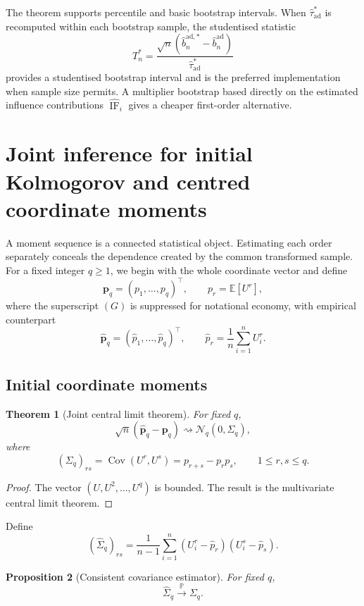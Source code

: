 \documentclass[11pt,a4paper]{article}
\newtheorem{theorem}{Theorem}[section]
\newtheorem{proposition}[theorem]{Proposition}
\theoremstyle{definition}
\newcommand{\E}{\mathbb{E}}
\newcommand{\Prob}{\mathbb{P}}
\newcommand{\Cov}{\operatorname{Cov}}
\newcommand{\IF}{\operatorname{IF}}
\begin{document}
The theorem supports percentile and basic bootstrap intervals. When $\widehat\tau_{\mathrm{ad}}^*$ is recomputed within each bootstrap sample, the studentised statistic
\[
T_n^*
=
\frac{\sqrt n(
\widehat b_n^{\mathrm{ad},*}-\widehat b_n^{\mathrm{ad}})}
{\widehat\tau_{\mathrm{ad}}^*}
\]
provides a studentised bootstrap interval and is the preferred implementation when sample size permits. A multiplier bootstrap based directly on the estimated influence contributions $\widehat{\IF}_i$ gives a cheaper first-order alternative.

\section{Joint inference for initial Kolmogorov and centred coordinate moments}\label{sec:moments}

A moment sequence is a connected statistical object. Estimating each order separately conceals the dependence created by the common transformed sample. For a fixed integer $q\geq1$, we begin with the whole coordinate vector and define
\[
\mathbf p_q
=
(p_1,\ldots,p_q)^\top,
\qquad
p_r=\E[U^r],
\]
where the superscript $(G)$ is suppressed for notational economy, with empirical counterpart
\[
\widehat{\mathbf p}_q
=
(\widehat p_1,\ldots,\widehat p_q)^\top,
\qquad
\widehat p_r
=
\frac1n\sum_{i=1}^nU_i^r.
\]

\subsection{Initial coordinate moments}

\begin{theorem}[Joint central limit theorem]\label{thm:joint-moments}
For fixed $q$,
\[
\sqrt n(\widehat{\mathbf p}_q-\mathbf p_q)
\rightsquigarrow
\mathcal N_q(0,\Sigma_q),
\]
where
\[
(\Sigma_q)_{rs}
=
\Cov(U^r,U^s)
=
p_{r+s}-p_rp_s,
\qquad 1\leq r,s\leq q.
\]
\end{theorem}

\begin{proof}
The vector $(U,U^2,\ldots,U^q)$ is bounded. The result is the multivariate central limit theorem.
\end{proof}

Define
\[
(\widehat\Sigma_q)_{rs}
=
\frac1{n-1}\sum_{i=1}^n
(U_i^r-\widehat p_r)(U_i^s-\widehat p_s).
\]

\begin{proposition}[Consistent covariance estimator]\label{prop:moment-cov}
For fixed $q$,
\[
\widehat\Sigma_q\xrightarrow{\Prob}\Sigma_q.
\]
\end{proposition}
\end{document}
